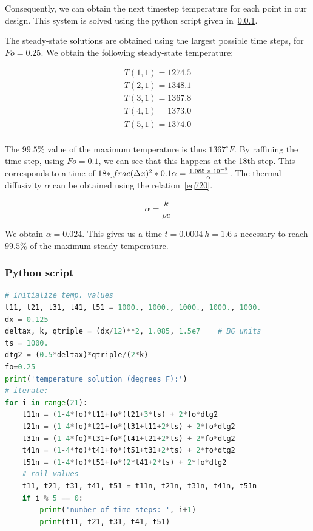 Consequently, we can obtain the next timestep temperature for each point in our design. This system is solved using the python script given in~\ref{py2}.

The steady-state solutions are obtained using the largest possible time steps, for $Fo=0.25$. We obtain the following steady-state temperature:

\begin{equation}\label{eq719}
\begin{aligned}
T(1,1) = 1274.5\\
T(2,1) = 1348.1\\
T(3,1) = 1367.8\\
T(4,1) = 1373.0\\
T(5,1) = 1374.0\\
\end{aligned}
\end{equation}

The $99.5\%$ value of the maximum temperature is thus $1367{}^\circ F$. By raffining the time step, using $Fo=0.1$, we can see that this happens at the 18th step. This corresponds to a time of $18 * ]frac{(\Delta x)^2 * 0.1}{\alpha} = \frac{\text{\num{1.085e-5}}}{\alpha}$. The thermal diffusivity $\alpha$ can be obtained using the relation~\ref{eq720}.

\begin{equation}\label{eq720}
\alpha = \frac{k}{\rho c}
\end{equation}

We obtain $\alpha = 0.024$. This gives us a time $t = 0.0004\ h = 1.6\ s$ necessary to reach $99.5\%$ of the maximum steady temperature.

\newpage
\subsubsection{Python script}
\label{py2}
\begin{lstlisting}[language=python]
# initialize temp. values
t11, t21, t31, t41, t51 = 1000., 1000., 1000., 1000., 1000.
dx = 0.125
deltax, k, qtriple = (dx/12)**2, 1.085, 1.5e7    # BG units
ts = 1000.
dtg2 = (0.5*deltax)*qtriple/(2*k)
fo=0.25
print('temperature solution (degrees F):')
# iterate:
for i in range(21):
    t11n = (1-4*fo)*t11+fo*(t21+3*ts) + 2*fo*dtg2
    t21n = (1-4*fo)*t21+fo*(t31+t11+2*ts) + 2*fo*dtg2
    t31n = (1-4*fo)*t31+fo*(t41+t21+2*ts) + 2*fo*dtg2
    t41n = (1-4*fo)*t41+fo*(t51+t31+2*ts) + 2*fo*dtg2
    t51n = (1-4*fo)*t51+fo*(2*t41+2*ts) + 2*fo*dtg2
    # roll values
    t11, t21, t31, t41, t51 = t11n, t21n, t31n, t41n, t51n
    if i % 5 == 0:
        print('number of time steps: ', i+1)
        print(t11, t21, t31, t41, t51)
\end{lstlisting}
\newpage

